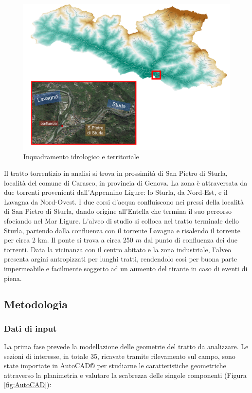 \documentclass[12pt]{article} %
\begin{document}
\begin{figure}[H]
    \centering
    \includegraphics[scale=0.6]{BacinoLavagna.png}
    \caption{Inquadramento idrologico e territoriale}
\end{figure}

\noindent Il tratto torrentizio in analisi si trova in prossimità di San Pietro di Sturla, località del comune di Carasco, in provincia di Genova. La zona è attraversata da due torrenti provenienti dall’Appennino Ligure: lo Sturla, da Nord-Est, e il Lavagna da Nord-Ovest. I due corsi d’acqua confluiscono nei pressi della località di San Pietro di Sturla, dando origine all’Entella che termina il suo percorso sfociando nel Mar Ligure. L’alveo di studio si colloca nel tratto terminale dello Sturla, partendo dalla confluenza con il torrente Lavagna e risalendo il torrente per circa 2 km. Il ponte si trova a circa 250 $m$ dal punto di confluenza dei due torrenti. Data la vicinanza con il centro abitato e la zona industriale, l’alveo presenta argini antropizzati per lunghi tratti, rendendolo così per buona parte impermeabile e facilmente soggetto ad un aumento del tirante in caso di eventi di piena.

\subsection{Metodologia}

\subsubsection{Dati di input}
\noindent La prima fase prevede la modellazione delle geometrie del tratto da analizzare. Le sezioni di interesse, in totale 35, ricavate tramite rilevamento sul campo, sono state importate in AutoCAD® per studiarne le caratteristiche geometriche attraverso la planimetria e valutare la scabrezza delle singole componenti (Figura \ref{fig:AutoCAD}): 
\end{document}
